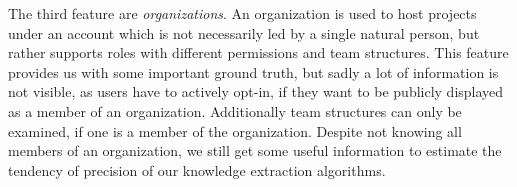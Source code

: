 The third feature are \emph{organizations}.
An organization is used to host projects under an account which is not necessarily led by a single natural person, but rather supports roles with different permissions and team structures.
This feature provides us with some important ground truth, but sadly a lot of information is not visible, as users have to actively opt-in, if they want to be publicly displayed as a member of an organization.
Additionally team structures can only be examined, if one is a member of the organization.
Despite not knowing all members of an organization, we still get some useful information to estimate the tendency of precision of our knowledge extraction algorithms.
